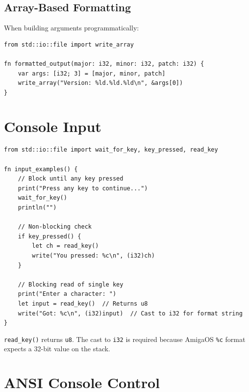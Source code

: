 \subsection{Array-Based Formatting}

When building arguments programmatically:

\begin{lstlisting}
from std::io::file import write_array

fn formatted_output(major: i32, minor: i32, patch: i32) {
    var args: [i32; 3] = [major, minor, patch]
    write_array("Version: %ld.%ld.%ld\n", &args[0])
}
\end{lstlisting}

\section{Console Input}
\label{sec:console-input}

\begin{lstlisting}
from std::io::file import wait_for_key, key_pressed, read_key

fn input_examples() {
    // Block until any key pressed
    print("Press any key to continue...")
    wait_for_key()
    println("")

    // Non-blocking check
    if key_pressed() {
        let ch = read_key()
        write("You pressed: %c\n", (i32)ch)
    }

    // Blocking read of single key
    print("Enter a character: ")
    let input = read_key()  // Returns u8
    write("Got: %c\n", (i32)input)  // Cast to i32 for format string
}
\end{lstlisting}

\begin{notebox}
\texttt{read\_key()} returns \texttt{u8}. The cast to \texttt{i32} is required because AmigaOS \texttt{\%c} format expects a 32-bit value on the stack.
\end{notebox}

\section{ANSI Console Control}
\label{sec:ansi}

